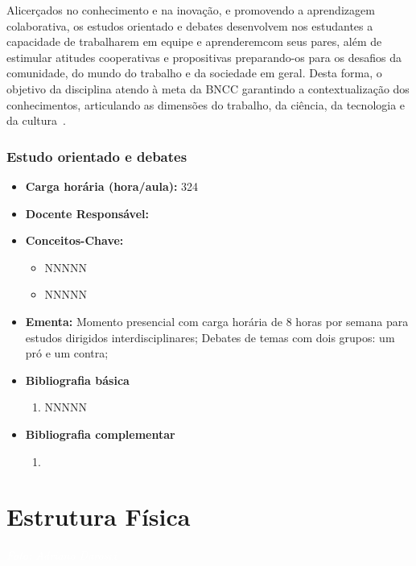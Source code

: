 \documentclass[11pt,fleqn]{book} %
\begin{document}
Alicerçados no conhecimento e na inovação, e promovendo a aprendizagem colaborativa, os estudos orientado e debates desenvolvem nos estudantes a capacidade de trabalharem em equipe e aprenderemcom seus pares, além de estimular atitudes cooperativas e propositivas preparando-os para os desafios da comunidade, do mundo do trabalho e da sociedade em geral.
Desta forma, o objetivo da disciplina atendo à meta da BNCC garantindo a contextualização dos conhecimentos, articulando as dimensões do trabalho, da ciência, da tecnologia e da cultura~\cite{BNCC2019}.


\subsection{Estudo orientado e debates}\label{disc:estudo}
\begin{itemize}
	\item \textbf{Carga horária (hora/aula):} 324
	\item \textbf{Docente Responsável:}
	\item \textbf{Conceitos-Chave:}
	\begin{itemize}
		\item NNNNN
		\item NNNNN
	\end{itemize}
	\item \textbf{Ementa:} Momento presencial com carga horária de 8 horas por semana para estudos dirigidos interdisciplinares; Debates de temas com dois grupos: um pró e um contra;
	\item \textbf{Bibliografia básica}
	\begin{enumerate}
		\item NNNNN
	\end{enumerate}
	\item \textbf{Bibliografia complementar}
	\begin{enumerate}
		\item 
	\end{enumerate}	
\end{itemize}



\chapter{Estrutura Física}
\vspace{6em}
\begin{flushright}
	\textit{\textcolor{white}{Foto: Adriano Darosci}}
\end{flushright}
\vspace{12em}
\end{document}
